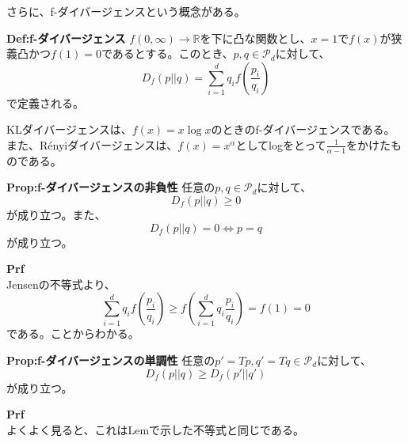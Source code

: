 \documentclass[a4paper,11pt]{jsarticle}
\numberwithin{equation}{section}
\begin{document}
さらに、f-ダイバージェンスという概念がある。\\
\begin{itembox}[l]{\textbf{Def:f-ダイバージェンス}}
    $f(0, \infty) \to \mathbb{R}$を下に凸な関数とし、$x=1$で$f(x)$が狭義凸かつ$f(1)=0$であるとする。このとき、$p, q \in \mathcal{P}_d$に対して、
    \begin{equation}
        D_f(p||q) = \sum_{i=1}^{d}q_i f\left(\frac{p_i}{q_i}\right)
    \end{equation}
    で定義される。
\end{itembox}

KLダイバージェンスは、$f(x) = x\log x$のときのf-ダイバージェンスである。また、Rényiダイバージェンスは、$f(x) = x^{\alpha}$としてlogをとって$\frac{1}{\alpha - 1}$をかけたものである。\\

\begin{itembox}[l]{\textbf{Prop:f-ダイバージェンスの非負性}}
    任意の$p, q \in \mathcal{P}_d$に対して、
    \begin{equation}
        D_f(p||q) \geq 0
    \end{equation}
    が成り立つ。また、
    \begin{equation}
        D_f(p||q) = 0 \Leftrightarrow p = q
    \end{equation}
    が成り立つ。
\end{itembox}
\textbf{Prf}\\
Jensenの不等式より、
\begin{equation}
    \sum_{i=1}^{d}q_i f\left(\frac{p_i}{q_i}\right) \geq f\left(\sum_{i=1}^{d}q_i \frac{p_i}{q_i}\right) = f(1) = 0
\end{equation}
である。ことからわかる。\hfill \qedsymbol\\

\begin{itembox}[l]{\textbf{Prop:f-ダイバージェンスの単調性}}
    任意の$p' = Tp, q' = Tq \in \mathcal{P}_d$に対して、
    \begin{equation}
        D_f(p||q) \geq D_f(p'||q')
    \end{equation}
    が成り立つ。
\end{itembox}
\textbf{Prf}\\
よくよく見ると、これはLemで示した不等式と同じである。\hfill \qedsymbol\\
\end{document}
